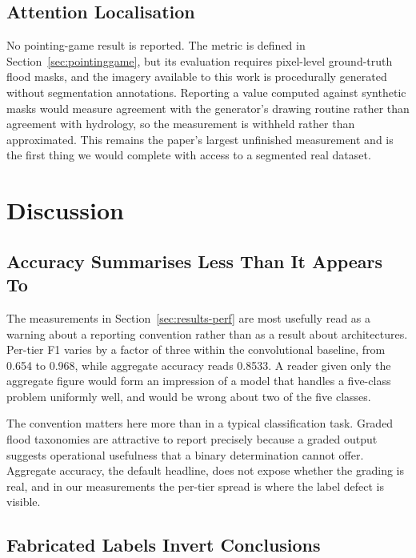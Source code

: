 \subsection{Attention Localisation}
\label{sec:results-attn}

No pointing-game result is reported. The metric is defined in
Section~\ref{sec:pointinggame}, but its evaluation requires pixel-level
ground-truth flood masks, and the imagery available to this work is
procedurally generated without segmentation annotations. Reporting a value
computed against synthetic masks would measure agreement with the generator's
drawing routine rather than agreement with hydrology, so the measurement is
withheld rather than approximated. This remains the paper's largest unfinished
measurement and is the first thing we would complete with access to a
segmented real dataset.

\section{Discussion}
\label{sec:discussion}

\subsection{Accuracy Summarises Less Than It Appears To}

The measurements in Section~\ref{sec:results-perf} are most usefully read as a
warning about a reporting convention rather than as a result about
architectures. Per-tier F1 varies by a factor of three within the
convolutional baseline, from 0.654 to 0.968, while aggregate accuracy reads
0.8533. A reader given only the aggregate figure would form an impression of a
model that handles a five-class problem uniformly well, and would be wrong
about two of the five classes.

The convention matters here more than in a typical classification task. Graded
flood taxonomies are attractive to report precisely because a graded output
suggests operational usefulness that a binary determination cannot offer.
Aggregate accuracy, the default headline, does not expose whether the grading is
real, and in our measurements the per-tier spread is where the label defect is
visible.

\subsection{Fabricated Labels Invert Conclusions}

